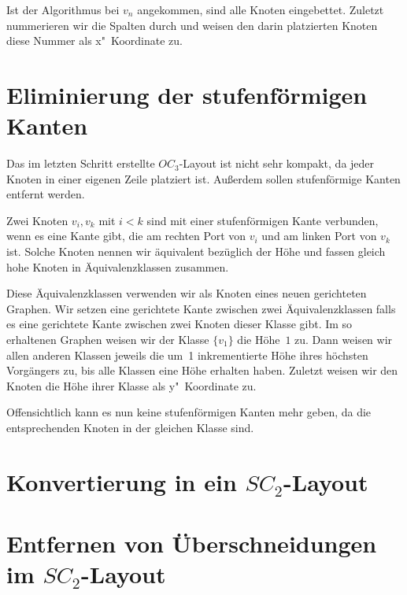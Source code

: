 \documentclass[a4paper]{scrreprt}
\theoremstyle{definition}
\begin{document}
Ist der Algorithmus bei $v_n$ angekommen, sind alle Knoten eingebettet. Zuletzt nummerieren wir die Spalten durch und weisen den darin platzierten Knoten diese Nummer als x"~Koordinate zu. 

\section{Eliminierung der stufenförmigen Kanten}

Das im letzten Schritt erstellte $OC_3$-Layout ist nicht sehr kompakt, da jeder Knoten in einer eigenen Zeile platziert ist. Außerdem sollen stufenförmige Kanten entfernt werden.

Zwei Knoten $v_i, v_k$ mit $i < k$ sind mit einer stufenförmigen Kante verbunden, wenn es eine Kante gibt, die am rechten Port von $v_i$ und am linken Port von $v_k$ ist. Solche Knoten nennen wir äquivalent bezüglich der Höhe und fassen gleich hohe Knoten in Äquivalenzklassen zusammen.

Diese Äquivalenzklassen verwenden wir als Knoten eines neuen gerichteten Graphen. Wir setzen eine gerichtete Kante zwischen zwei Äquivalenzklassen falls es eine gerichtete Kante zwischen zwei Knoten dieser Klasse gibt. Im so erhaltenen Graphen weisen wir der Klasse $\{v_1\}$ die Höhe~$1$ zu. Dann weisen wir allen anderen Klassen jeweils die um~1 inkrementierte Höhe ihres höchsten Vorgängers zu, bis alle Klassen eine Höhe erhalten haben. Zuletzt weisen wir den Knoten die Höhe ihrer Klasse als y"~Koordinate zu.

Offensichtlich kann es nun keine stufenförmigen Kanten mehr geben, da die entsprechenden Knoten in der gleichen Klasse sind.

\section{Konvertierung in ein $SC_2$-Layout}



\section{Entfernen von Überschneidungen im $SC_2$-Layout}
\end{document}

